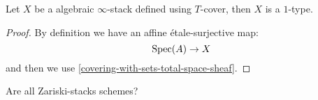 


\begin{corollary}
Let $X$ be a algebraic $\infty$-stack defined using $T$-cover, then $X$ is a $1$-type.
\end{corollary}

\begin{proof}
By definition we have an affine étale-surjective map:
\[\operatorname{Spec}(A)\to X\]
 and then we use \cref{covering-with-sets-total-space-sheaf}.
\end{proof}

\begin{remark}
Are all Zariski-stacks schemes?
\end{remark}



